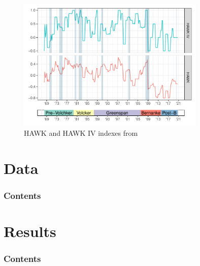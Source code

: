 \documentclass[11pt,pdf,aspectratio=129]{beamer}
\begin{document}
\begin{frame}{}
    \begin{figure}[h!]
        \caption{HAWK and HAWK IV indexes from \citet{HIM2023}}
        \includegraphics[width=0.8\textwidth]{HAWK_plot_w_heads.pdf}
    \end{figure}
\end{frame}




\section{Data}
\begin{frame}
    \frametitle{Contents}
    \tableofcontents[currentsection]
\end{frame}




    




\section{Results}
\begin{frame}
    \frametitle{Contents}
    \tableofcontents[currentsection]
\end{frame}
\end{document}
